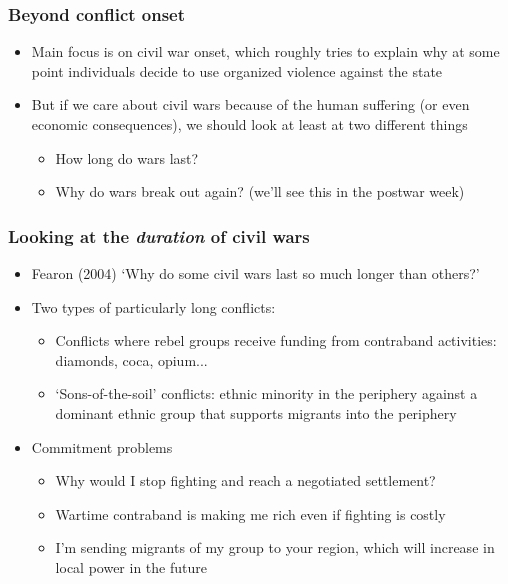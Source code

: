 \documentclass[utf8, xcolor=dvipsnames]{beamer}
\begin{document}
\begin{frame}
\frametitle{Beyond conflict onset}
\centering

\begin{itemize}[<+->]
  \item Main focus is on civil war onset, which roughly tries to explain why at some point individuals decide to use organized violence against the state
  \item But if we care about civil wars because of the human suffering (or even economic consequences), we should look at least at two different things
  \begin{itemize}
    \item How long do wars last?
    \item Why do wars break out again? (we'll see this in the postwar week)
  \end{itemize}
\end{itemize}

\end{frame}

\begin{frame}
\frametitle{Looking at the \textit{duration} of civil wars}
\centering

\begin{itemize}[<+->]
  \item Fearon (2004) `Why do some civil wars last so much longer than others?'
  \item Two types of particularly long conflicts:
  \begin{itemize}
    \item Conflicts where rebel groups receive funding from contraband activities: diamonds, coca, opium...
    \item `Sons-of-the-soil' conflicts: ethnic minority in the periphery against a dominant ethnic group that supports migrants into the periphery
  \end{itemize}
  \item Commitment problems
  \begin{itemize}
    \item Why would I stop fighting and reach a negotiated settlement?
    \item Wartime contraband is making me rich even if fighting is costly
    \item I'm sending migrants of my group to your region, which will increase in local power in the future
  \end{itemize}
\end{itemize}

\end{frame}
\end{document}
